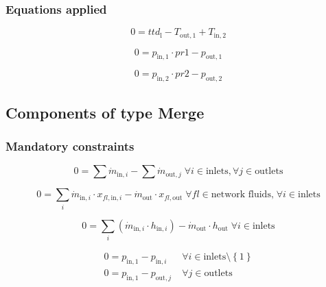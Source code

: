 \documentclass[]{article}
\begin{document}
\subsubsection{Equations applied}

\begin{equation}
\label{eq:HeatExchanger_ttd_l}
0 = ttd_\mathrm{l} - T_\mathrm{out,1} + T_\mathrm{in,2}
\end{equation}

\begin{equation}
\label{eq:HeatExchanger_pr1}
0=p_\mathrm{in,1}\cdot pr1 - p_\mathrm{out,1}
\end{equation}

\begin{equation}
\label{eq:HeatExchanger_pr2}
0=p_\mathrm{in,2}\cdot pr2 - p_\mathrm{out,2}
\end{equation}


\subsection{Components of type Merge}

\subsubsection{Mandatory constraints}

\begin{equation}
\label{eq:Merge_mass_flow_constraints}
0 =\sum\dot{m}_{\mathrm{in},i}-\sum\dot{m}_{\mathrm{out},j}\;\forall i \in \text{inlets}, \forall j \in \text{outlets}
\end{equation}

\begin{equation}
\label{eq:Merge_fluid_constraints}
0=\sum_i \dot{m}_{\mathrm{in,}i} \cdot x_{fl\mathrm{,in,}i}- \dot {m}_\mathrm{out} \cdot x_{fl\mathrm{,out}}\; \forall fl \in \text{network fluids,} \; \forall i \in\text{inlets}
\end{equation}

\begin{equation}
\label{eq:Merge_energy_balance_constraints}
0=\sum_i\left(\dot{m}_{\mathrm{in,}i}\cdot h_{\mathrm{in,}i}\right) - \dot{m}_\mathrm{out} \cdot h_\mathrm{out} \; \forall i \in \text{inlets}
\end{equation}

\begin{equation}
\label{eq:Merge_pressure_constraints}
\begin{split}
0 = p_\mathrm{in,1} - p_{\mathrm{in,}i} & \; \forall i \in \text{inlets} \setminus \left\lbrace 1\right\rbrace\\
0 = p_\mathrm{in,1} - p_{\mathrm{out,}j} & \; \forall j \in \text{outlets}\\
\end{split}
\end{equation}
\end{document}

